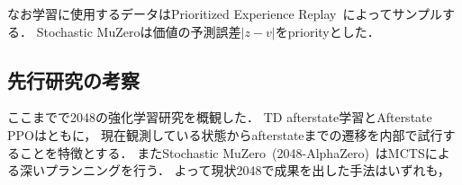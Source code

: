 なお学習に使用するデータはPrioritized Experience Replay~\cite{prioritized}によってサンプルする．
Stochastic MuZeroは価値の予測誤差$|z-v|$をpriorityとした．

\subsection{先行研究の考察}
ここまでで2048の強化学習研究を概観した．
TD afterstate学習とAfterstate PPOはともに， 現在観測している状態からafterstateまでの遷移を内部で試行することを特徴とする．
またStochastic MuZero~(2048-AlphaZero)~はMCTSによる深いプランニングを行う．
よって現状2048で成果を出した手法はいずれも， 